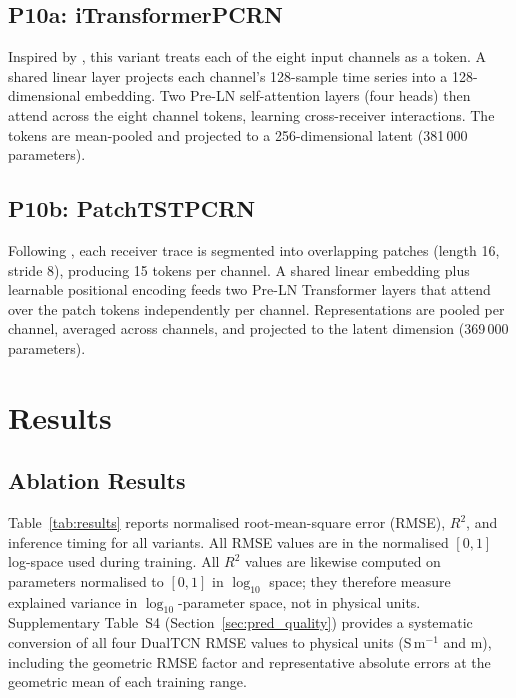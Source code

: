\documentclass[journal]{IEEEtran}
\begin{document}
\subsection{P10a: iTransformerPCRN}
\label{sec:p10a}

Inspired by \citet{liu2024itransformer}, this variant treats each of
the eight input channels as a token. A shared linear layer projects
each channel's 128-sample time series into a 128-dimensional
embedding. Two Pre-LN self-attention layers (four heads) then attend
across the eight channel tokens, learning cross-receiver
interactions. The tokens are mean-pooled and projected to a
256-dimensional latent (381\,000 parameters).

\subsection{P10b: PatchTSTPCRN}
\label{sec:p10b}

Following \citet{nie2023patchtst}, each receiver trace is segmented
into overlapping patches (length 16, stride 8), producing 15 tokens
per channel. A shared linear embedding plus learnable positional
encoding feeds two Pre-LN Transformer layers that attend over the
patch tokens independently per channel. Representations are pooled
per channel, averaged across channels, and projected to the latent
dimension (369\,000 parameters).

\section{Results}
\label{sec:results}

\subsection{Ablation Results}

Table~\ref{tab:results} reports normalised root-mean-square error (RMSE),
$R^2$, and inference timing for all variants. All RMSE values are in
the normalised $[0,1]$ log-space used during training. All $R^2$
values are likewise computed on parameters normalised to $[0,1]$ in
$\log_{10}$ space; they therefore measure explained variance in
$\log_{10}$-parameter space, not in physical units.
Supplementary Table~S4 (Section~\ref{sec:pred_quality}) provides
a systematic conversion of all four DualTCN RMSE values to physical
units (S\,m$^{-1}$ and m), including the geometric RMSE factor and
representative absolute errors at the geometric mean of each training
range.
\end{document}
